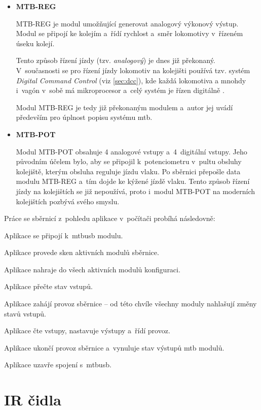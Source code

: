 \begin{itemize}
\item \textbf{MTB-REG}

	MTB-REG je modul umožňující generovat analogový výkonový výstup. Modul se
	připojí ke kolejím a~řídí rychlost a~směr lokomotivy v~řízeném úseku kolejí.

	Tento způsob řízení jízdy (tzv. \textit{analogový}) je dnes již překonaný.
	V~současnosti se pro řízení jízdy lokomotiv na kolejišti používá tzv. systém
	\textit{Digital Command Control} (viz \ref{sec:dcc}), kde každá lokomotiva
	a mnohdy i~vagón v~sobě má mikroprocesor a~celý systém je řízen
	digitálně \cite{dcc_intro:web}.

	Modul MTB-REG je tedy již překonaným modulem a~autor jej uvádí především pro
	úplnost popisu systému \gls{mtb}.

\item \textbf{MTB-POT}

	Modul MTB-POT obsahuje 4 analogové vstupy a~4~digitální vstupy. Jeho
	původním účelem bylo, aby se připojil k~potenciometru v~pultu obsluhy
	kolejiště, kterým obsluha reguluje jízdu vlaku. Po sběrnici přepošle data
	modulu MTB-REG a~tím dojde ke kýžené jízdě vlaku. Tento způsob řízení jízdy
	na kolejištích se již nepoužívá, proto i~modul MTB-POT na moderních
	kolejištích pozbývá svého smyslu.

\end{itemize}

Práce se sběrnicí z~pohledu aplikace v~počítači probíhá následovně:

\begin{compactenum}
\item Aplikace se připojí k~\gls{mtbusb} modulu.
\item Aplikace provede sken aktivních modulů sběrnice.
\item Aplikace nahraje do všech aktivních modulů konfiguraci.
\item Aplikace přečte stav vstupů.
\item Aplikace zahájí provoz sběrnice – od této chvíle všechny moduly nahlašují
	změny stavů vstupů.
\item Aplikace čte vstupy, nastavuje výstupy a~řídí provoz.
\item Aplikace ukončí provoz sběrnice a~vynuluje stav výstupů \gls{mtb} modulů.
\item Aplikace uzavře spojení s~\gls{mtbusb}.
\end{compactenum}


\section{IR čidla} \label{sec:ir}

